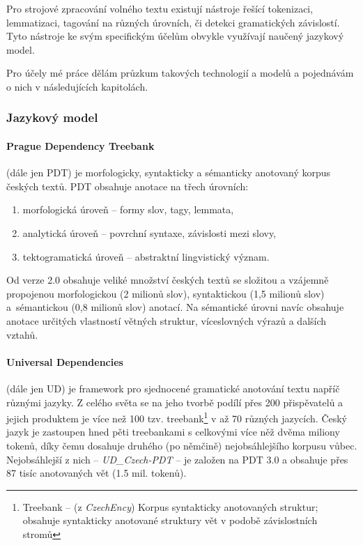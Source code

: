 \documentclass[thesis=M,czech]{FITthesis}[2019/12/23]
\begin{document}
Pro strojové zpracování volného textu existují nástroje řešící tokenizaci, lemmatizaci, tagování na různých úrovních, či detekci gramatických závislostí. Tyto nástroje ke svým specifickým účelům obvykle využívají naučený jazykový model.

Pro účely mé práce dělám průzkum takových technologií a modelů a pojednávám o nich v následujících kapitolách.

\subsubsection{Jazykový model}

\paragraph{Prague Dependency Treebank}

(dále jen PDT) je morfologicky, syntakticky a sémanticky anotovaný korpus českých textů\cite{PDT}. PDT obsahuje anotace na třech úrovních:
\begin{enumerate}
    \item morfologická úroveň -- formy slov, tagy, lemmata, 
    \item analytická úroveň -- povrchní syntaxe, závislosti mezi slovy,
    \item tektogramatická úroveň -- abstraktní lingvistický význam.
\end{enumerate}
Od verze 2.0 obsahuje veliké množství českých textů se složitou a vzájemně propojenou morfologickou (2 milionů slov), syntaktickou (1,5 milionů slov) a~sémantickou (0,8 milionů slov) anotací. Na sémantické úrovni navíc obsahuje anotace určitých vlastností větných struktur, víceslovných výrazů a dalších vztahů.

\paragraph{Universal Dependencies}

(dále jen UD) je framework pro sjednocené gramatické anotování textu napříč různými jazyky\cite{UDweb}. Z celého světa se na jeho tvorbě podílí přes 200 přispěvatelů a jejich produktem je více než 100 tzv. treebank\footnote{Treebank -- (z \textit{CzechEncy}) Korpus syntakticky anotovaných struktur; obsahuje syntakticky anotované struktury vět v podobě závislostních stromů} v až 70 různých jazycích. Český jazyk je zastoupen hned pěti treebankami s celkovými více něž dvěma miliony tokenů, díky čemu dosahuje druhého (po němčině) nejobsáhlejšího korpusu vůbec. Nejobsáhlejší z nich -- \textit{UD\_Czech-PDT} -- je založen na PDT 3.0 a obsahuje přes 87 tisíc anotovaných vět (1.5 mil. tokenů).
\end{document}
